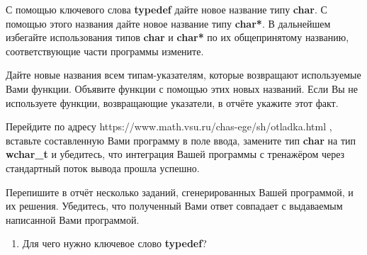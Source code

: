\labtask

С помощью ключевого слова \textbf{typedef} дайте новое название типу \textbf{char}.
С помощью этого названия дайте новое название типу \textbf{char*}.
В дальнейшем избегайте использования типов \textbf{char} и \textbf{char*} по их общепринятому названию,
соответствующие части программы измените.

\labtask

Дайте новые названия  всем типам-указателям, которые возвращают используемые Вами функции.
Объявите функции с помощью этих новых названий.
Если Вы не используете функции, возвращающие указатели, в отчёте укажите этот факт.

\labtask

Перейдите по адресу https://www.math.vsu.ru/chas-ege/sh/otladka.html , вставьте составленную Вами программу в поле ввода,
замените тип \textbf{char} на тип \textbf{wchar\_t} и убедитесь, что интеграция Вашей программы с тренажёром через стандартный поток вывода прошла успешно.

\labtask

Перепишите в отчёт несколько заданий, сгенерированных Вашей программой, и их решения.
Убедитесь, что полученный Вами ответ совпадает с выдаваемым написанной Вами программой.

\labworkquestions

\begin{enumerate}
	\item
		Для чего нужно ключевое слово \textbf{typedef}?
\end{enumerate}




